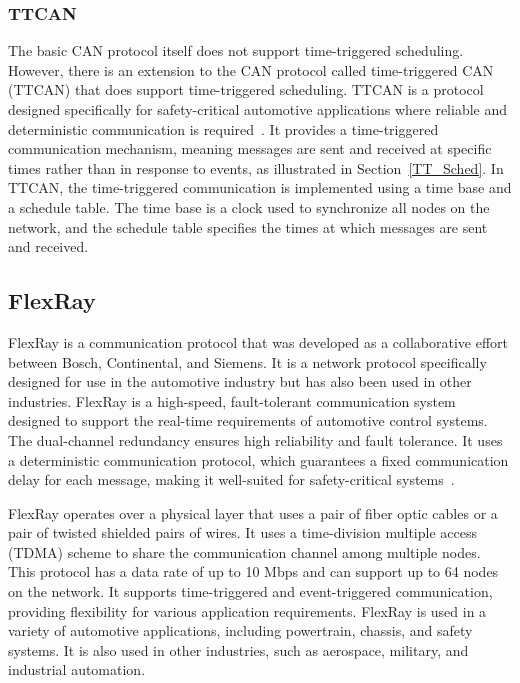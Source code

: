     \subsubsection{TTCAN}
    The basic CAN protocol itself does not support time-triggered scheduling. However, there is an extension to the CAN protocol called time-triggered CAN (TTCAN) that does support time-triggered scheduling.
    TTCAN is a protocol designed specifically for safety-critical automotive applications where reliable and deterministic communication is required~\cite{leen2002ttcan}. It provides a time-triggered communication mechanism, meaning messages are sent and received at specific times rather than in response to events, as illustrated in Section~\ref{TT_Sched}.
    In TTCAN, the time-triggered communication is implemented using a time base and a schedule table. The time base is a clock used to synchronize all nodes on the network, and the schedule table specifies the times at which messages are sent and received.
    

    \subsection{FlexRay}
    
    FlexRay is a communication protocol that was developed as a collaborative effort between Bosch, Continental, and Siemens. It is a network protocol specifically designed for use in the automotive industry but has also been used in other industries.
    FlexRay is a high-speed, fault-tolerant communication system designed to support the real-time requirements of automotive control systems. The dual-channel redundancy ensures high reliability and fault tolerance. It uses a deterministic communication protocol, which guarantees a fixed communication delay for each message, making it well-suited for safety-critical systems~\cite{makowitz2006flexray}.
    
    FlexRay operates over a physical layer that uses a pair of fiber optic cables or a pair of twisted shielded pairs of wires. It uses a time-division multiple access (TDMA) scheme to share the communication channel among multiple nodes. This protocol has a data rate of up to 10 Mbps and can support up to 64 nodes on the network. It supports time-triggered and event-triggered communication, providing flexibility for various application requirements.
    FlexRay is used in a variety of automotive applications, including powertrain, chassis, and safety systems. It is also used in other industries, such as aerospace, military, and industrial automation.
    
